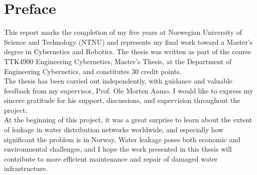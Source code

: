\chapter*{Preface}

This report marks the completion of my five years at Norwegian University of Science and Technology (NTNU) and represents my final work toward a Master’s degree in Cybernetics and Robotics. The thesis was written as part of the course TTK4900 Engineering Cybernetics, Master’s Thesis, at the Department of Engineering Cybernetics, and constitutes 30 credit points.\\

The thesis has been carried out independently, with guidance and valuable feedback from my supervisor, Prof. Ole Morten Aamo. I would like to express my sincere gratitude for his support, discussions, and supervision throughout the project.\\

At the beginning of this project, it was a great surprise to learn about the extent of leakage in water distribution networks worldwide, and especially how significant the problem is in Norway. Water leakage poses both economic and environmental challenges, and I hope the work presented in this thesis will contribute to more efficient maintenance and repair of damaged water infrastructure.
